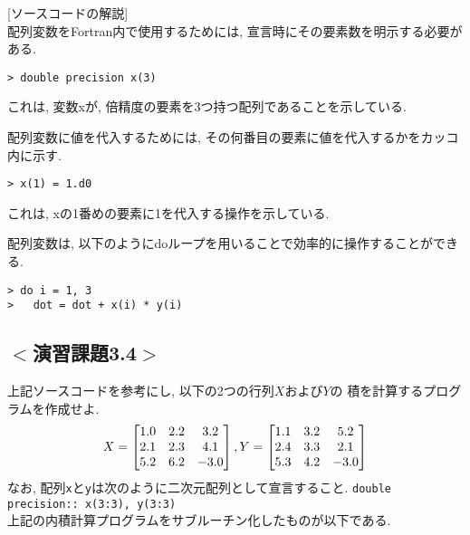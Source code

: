 

[ソースコードの解説]\\
配列変数をFortran内で使用するためには, 宣言時にその要素数を明示する必要がある.

\begin{Verbatim}[frame=single]
> double precision x(3)
\end{Verbatim}
これは, 変数{\ttfamily x}が, 倍精度の要素を3つ持つ配列であることを示している.

配列変数に値を代入するためには, その何番目の要素に値を代入するかをカッコ内に示す.
\begin{Verbatim}[frame=single]
> x(1) = 1.d0
\end{Verbatim}
これは, {\ttfamily x}の1番めの要素に1を代入する操作を示している.

配列変数は, 以下のように{\ttfamily do}ループを用いることで効率的に操作することができる.
\begin{Verbatim}[frame=single]
> do i = 1, 3
>   dot = dot + x(i) * y(i)
\end{Verbatim}
\fi

\subsection*{$<$演習課題3.4$>$}
上記ソースコードを参考にし, 以下の2つの行列$X$および$Y$の
積を計算するプログラムを作成せよ.
\begin{equation}
X =
\begin{bmatrix}
  1.0 & 2.2 & 3.2 \\
  2.1 & 2.3 & 4.1 \\
  5.2 & 6.2 & -3.0\\
\end{bmatrix},\\
Y =
\begin{bmatrix}
  1.1 & 3.2 &  5.2 \\
  2.4 & 3.3 &  2.1 \\
  5.3 & 4.2 & -3.0 \\
\end{bmatrix}
\end{equation}
なお, 配列\verb|x|と\verb|y|は次のように二次元配列として宣言すること.
\verb|double precision:: x(3:3), y(3:3)|\\


上記の内積計算プログラムをサブルーチン化したものが以下である.

